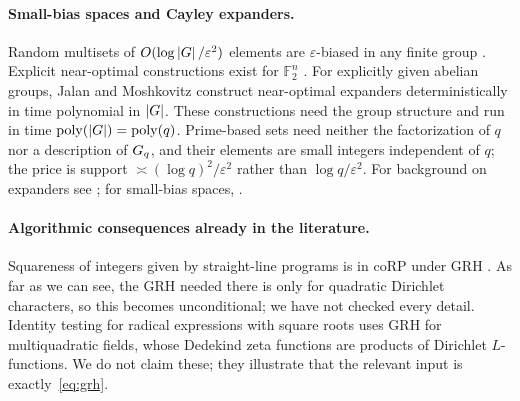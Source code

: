 \paragraph{Small-bias spaces and Cayley expanders.}
Random multisets of $O(\log\left\lvert G \right\rvert/\varepsilon^2)$ elements are $\varepsilon$-biased in any finite group
\cite{alonroichman1994}. Explicit near-optimal constructions exist for $\mathbb F_2^n$ \cite{tashma2017}. For
explicitly given abelian groups, Jalan and Moshkovitz \cite{jalanmoshkovitz2021} construct near-optimal
expanders deterministically in time polynomial in $\left\lvert G \right\rvert$. These constructions need the group structure
and run in time $\operatorname{poly}(\left\lvert G \right\rvert)=\operatorname{poly}(q)$. Prime-based sets need neither the
factorization of $q$ nor a description of $G_q$, and their elements are small integers independent of
$q$; the price is support $\asymp(\log q)^2/\varepsilon^2$ rather than $\log q/\varepsilon^2$. For
background on expanders see \cite{hlw2006}; for small-bias spaces, \cite{naornaor1993}.

\paragraph{Algorithmic consequences already in the literature.}
Squareness of integers given by straight-line programs is in coRP under GRH \cite{gaillardjindal2023}.
As far as we can see, the GRH needed there is only for quadratic Dirichlet characters, so this becomes
unconditional; we have not checked every detail.
Identity testing for radical expressions with square roots \cite{bnsw2022} uses GRH for multiquadratic
fields, whose Dedekind zeta functions are products of Dirichlet $L$-functions. We do not claim these;
they illustrate that the relevant input is exactly~\eqref{eq:grh}.
